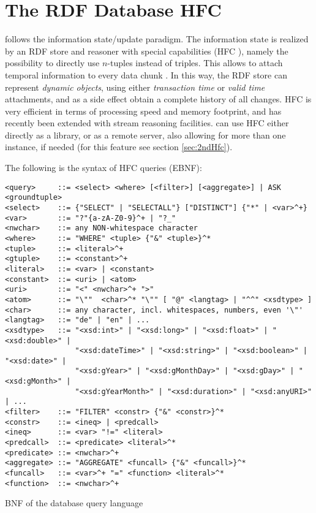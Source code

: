 \section{The RDF Database HFC} \label{sec:hfc}

\vonda follows the information state/update paradigm. The information state is
realized by an RDF store and reasoner with special capabilities
(HFC \cite{krieger2013efficient}), namely the
possibility to directly use $n$-tuples instead of triples. This allows to
attach temporal information to every data chunk \cite{Krieger:FOIS2012,
  krieger2014detailed}. In this way, the RDF store can represent \emph{dynamic
  objects}, using either \emph{transaction time} or \emph{valid time}
attachments, and as a side effect obtain a complete history of all changes.
HFC is very efficient in terms of processing speed and memory footprint, and
has recently been extended with stream reasoning facilities. \vonda can use HFC
either directly as a library, or as a remote server, also allowing for more
than one instance, if needed (for this feature see section \ref{sec:2ndHfc}).

The following is the syntax of HFC queries (EBNF):
\begin{table}[htbp]
  \centering\small
\begin{verbatim}
<query>     ::= <select> <where> [<filter>] [<aggregate>] | ASK <groundtuple>
<select>    ::= {"SELECT" | "SELECTALL"} ["DISTINCT"] {"*" | <var>^+}
<var>       ::= "?"{a-zA-Z0-9}^+ | "?_"
<nwchar>    ::= any NON-whitespace character
<where>     ::= "WHERE" <tuple> {"&" <tuple>}^*
<tuple>     ::= <literal>^+
<gtuple>    ::= <constant>^+
<literal>   ::= <var> | <constant>
<constant>  ::= <uri> | <atom>
<uri>       ::= "<" <nwchar>^+ ">"
<atom>      ::= "\""  <char>^* "\"" [ "@" <langtag> | "^^" <xsdtype> ]
<char>      ::= any character, incl. whitespaces, numbers, even '\"'
<langtag>   ::= "de" | "en" | ...
<xsdtype>   ::= "<xsd:int>" | "<xsd:long>" | "<xsd:float>" | "<xsd:double>" |
                "<xsd:dateTime>" | "<xsd:string>" | "<xsd:boolean>" | "<xsd:date>" |
                "<xsd:gYear>" | "<xsd:gMonthDay>" | "<xsd:gDay>" | "<xsd:gMonth>" |
                "<xsd:gYearMonth>" | "<xsd:duration>" | "<xsd:anyURI>" | ...
<filter>    ::= "FILTER" <constr> {"&" <constr>}^*
<constr>    ::= <ineq> | <predcall>
<ineq>      ::= <var> "!=" <literal>
<predcall>  ::= <predicate> <literal>^*
<predicate> ::= <nwchar>^+
<aggregate> ::= "AGGREGATE" <funcall> {"&" <funcall>}^*
<funcall>   ::= <var>^+ "=" <function> <literal>^*
<function>  ::= <nwchar>^+
\end{verbatim}
  \caption{BNF of the database query language}
  \label{tab:hfcquerybnf}
\end{table}

